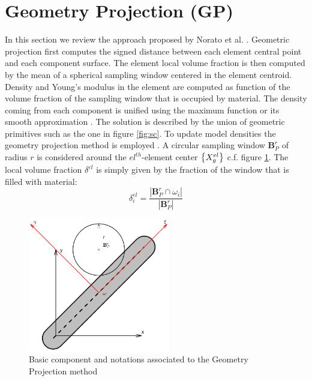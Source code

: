 \section{Geometry Projection (GP)}
\label{GP}
In this section we review the approach proposed by Norato et al. \cite{norato2015geometry}. Geometric projection first computes the signed distance between each element central point and each component surface. The element local volume fraction is then computed by the mean of a spherical sampling window centered in the element centroid. Density and Young's modulus in the element are computed as function of the volume fraction of the sampling window that is occupied by material. The density coming from each component is unified using the maximum function or its smooth approximation \cite{kreisselmeier1980systematic}. The solution is described by the union of geometric primitives such as the one in figure \ref{fig:sc}. To update model densities the geometry projection method is employed \cite{norato2004geometry}. A circular sampling window  $\mathbf{B}_P^r$ of radius $r$ is considered around the $el^{th}$-element center $ \left\{{X_g^{el}}\right\}$ c.f. figure \ref{fig:gp}.
The local volume fraction  $\delta^{el}$ is simply given by the fraction of the window that is filled with material:
\begin{equation}
\label{gpdef}
    \delta^{el}_i=\frac{|\mathbf{B}_P^r\cap\omega_i|}{|\mathbf{B}_P^r|}
\end{equation}
\begin{figure}[ht]
\centering
  \includegraphics[width=0.55\textwidth,trim={0.8cm 0.5cm 0.5cm 0.5cm},clip]{images/Ch3/geometric_projection.eps}
\caption{Basic component and notations associated to the Geometry Projection method \cite{norato2015geometry}}
\label{fig:gp}       %
\end{figure}
